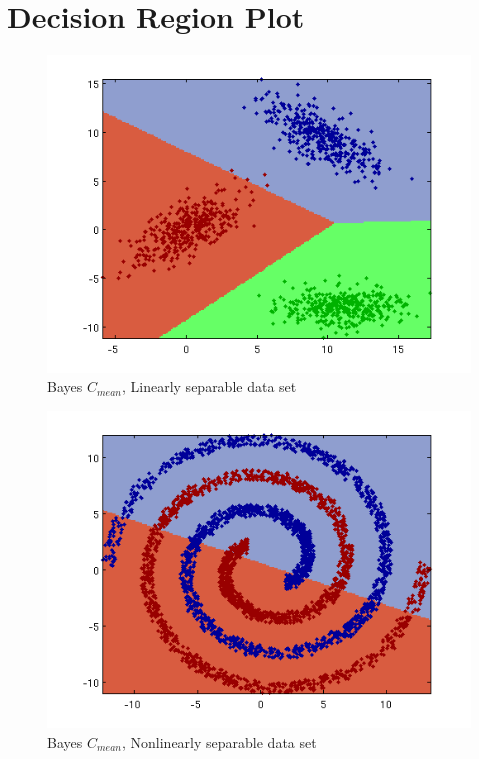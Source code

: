 \documentclass[a4paper]{article}
\begin{document}
\section{Decision Region Plot}
\begin{figure}[h]
\includegraphics[clip, trim=40px 15px 30px 10px]{data1a_1a.png}
\caption{Bayes $C_{mean}$, Linearly separable data set}
\end{figure}
\begin{figure}[h]
\includegraphics[clip, trim=40px 15px 30px 10px]{data1b_1a.png}
\caption{Bayes $C_{mean}$, Nonlinearly separable data set}
\end{figure}
\end{document}
